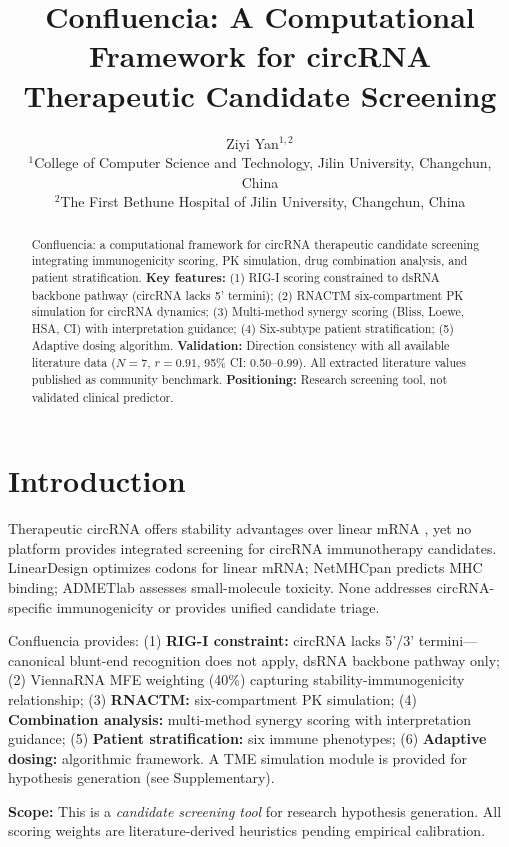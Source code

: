 \documentclass{article}
\title{Confluencia: A Computational Framework for circRNA Therapeutic Candidate Screening}
\author{
Ziyi Yan$^{1,2}$ \\
$^{1}$College of Computer Science and Technology, Jilin University, Changchun, China \\
$^{2}$The First Bethune Hospital of Jilin University, Changchun, China \\
}
\begin{document}
\begin{abstract}
Confluencia: a computational framework for circRNA therapeutic candidate screening integrating immunogenicity scoring, PK simulation, drug combination analysis, and patient stratification. \textbf{Key features:} (1) RIG-I scoring constrained to dsRNA backbone pathway (circRNA lacks 5' termini); (2) RNACTM six-compartment PK simulation for circRNA dynamics; (3) Multi-method synergy scoring (Bliss, Loewe, HSA, CI) with interpretation guidance; (4) Six-subtype patient stratification; (5) Adaptive dosing algorithm. \textbf{Validation:} Direction consistency with all available literature data ($N{=}7$, $r{=}0.91$, 95\% CI: 0.50--0.99). All extracted literature values published as community benchmark. \textbf{Positioning:} Research screening tool, not validated clinical predictor.
\end{abstract}

\section{Introduction}
Therapeutic circRNA offers stability advantages over linear mRNA \citep{wesselhoeft2018,chen2019}, yet no platform provides integrated screening for circRNA immunotherapy candidates. LinearDesign optimizes codons for linear mRNA; NetMHCpan predicts MHC binding; ADMETlab assesses small-molecule toxicity. None addresses circRNA-specific immunogenicity or provides unified candidate triage.

Confluencia provides: (1) \textbf{RIG-I constraint:} circRNA lacks 5'/3' termini---canonical blunt-end recognition does not apply, dsRNA backbone pathway only; (2) ViennaRNA MFE weighting (40\%) capturing stability-immunogenicity relationship; (3) \textbf{RNACTM:} six-compartment PK simulation; (4) \textbf{Combination analysis:} multi-method synergy scoring with interpretation guidance; (5) \textbf{Patient stratification:} six immune phenotypes; (6) \textbf{Adaptive dosing:} algorithmic framework. A TME simulation module is provided for hypothesis generation (see Supplementary).

\textbf{Scope:} This is a \textit{candidate screening tool} for research hypothesis generation. All scoring weights are literature-derived heuristics pending empirical calibration.
\end{document}
